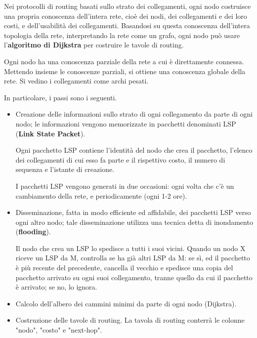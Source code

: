             Nei protocolli di routing basati sullo strato dei collegamenti, ogni nodo costruisce una propria conoscenza dell'intera rete, cioè dei nodi, dei collegamenti e dei loro costi, e dell'usabilità dei collegamenti. Basandosi su questa conoscenza dell'intera topologia della rete, interpretando la rete come un grafo, ogni nodo può usare l'\textbf{algoritmo di Dijkstra} per costruire le tavole di routing.
            
            \vspace{3mm}
            
            Ogni nodo ha una conoscenza parziale della rete a cui è direttamente connessa. Mettendo insieme le conoscenze parziali, si ottiene una conoscenza globale della rete. Si vedino i collegamenti come archi pesati.
            
            \vspace{3mm}
            
            In particolare, i passi sono i seguenti.
            
            \begin{itemize}
                \item 
                    Creazione delle informazioni sullo strato di ogni collegamento da parte di ogni nodo; le informazioni vengono memorizzate in pacchetti denominati LSP (\textbf{Link State Packet}). 
                    
                    Ogni pacchetto LSP contiene l'identità del nodo che crea il pacchetto, l'elenco dei collegamenti di cui esso fa parte e il rispettivo costo, il numero di sequenza e l'istante di creazione. 
                    
                    I pacchetti LSP vengono generati in due occasioni: ogni volta che c'è un cambiamento della rete, e periodicamente (ogni 1-2 ore).
                
                \item
                    Disseminazione, fatta in modo efficiente ed affidabile, dei pacchetti LSP verso ogni altro nodo; tale disseminazione utilizza una tecnica detta di inondamento (\textbf{flooding}). 
                    
                    Il nodo che crea un LSP lo spedisce a tutti i suoi vicini. Quando un nodo X riceve un LSP da M, controlla se ha già altri LSP da M: se sì, ed il pacchetto è più recente del precedente, cancella il vecchio e spedisce una copia del pacchetto arrivato su ogni suoi collegamento, tranne quello da cui il pacchetto è arrivato; se no, lo ignora.
                    
                \item
                    Calcolo dell'albero dei cammini minimi da parte di ogni nodo (Dijkstra).
                    
                \item
                    Costruzione delle tavole di routing. La tavola di routing conterrà le colonne "nodo", "costo" e "next-hop".
            \end{itemize}
        
